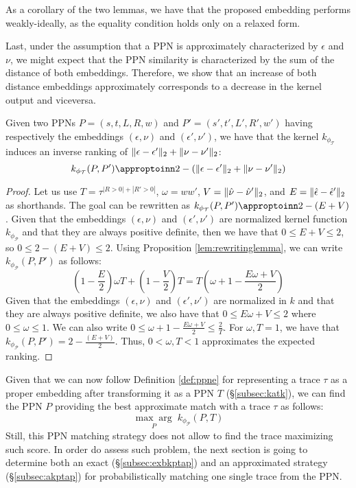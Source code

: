 As a corollary of the two lemmas, we have that the proposed embedding performs weakly-ideally, as the equality condition holds only on a relaxed form.

Last, under the assumption that a PPN is approximately characterized by $\epsilon$ and $\nu$, we might expect that the PPN similarity is characterized by the sum of the distance of both embeddings. Therefore, we show that an increase of both distance embeddings approximately corresponds to a decrease in the kernel output and viceversa.

\begin{lemma}\label{lem:approxRank}
Given two PPNs $P=(s,t,L,R,w)$ and $P'=(s',t',L',R',w')$ having respectively the embeddings $(\epsilon,\nu)$ and $(\epsilon',\nu')$, we have that the kernel $k_{\phi_{\mathcal{T}}}$ induces an inverse ranking of $\|\epsilon-\epsilon'\|_{2}+\|\nu-\nu'\|_{2}$:
$$k_{\phi_{\mathcal{T}}}(P,P')\appropto 2-(\norm{\epsilon-\epsilon'}{2}+\norm{\nu-\nu'}{2})$$
\end{lemma}
\begin{proof}
Let us use $T=\tau^{|R>0|+|R'>0|}$, $\omega=ww'$, $V=\|\hat{\nu}-\hat{\nu}'\|_{2}$, and $E=\|\hat{\epsilon}-\hat{\epsilon}'\|_{2}$ as shorthands. The goal can be rewritten as $k_{\phi_{\mathcal{T}}}(P,P')\appropto 2-(E+V)$. Given that the embeddings $(\epsilon,\nu)$ and $(\epsilon',\nu')$ are normalized kernel function $k_{\phi_{\mathcal{P}}}$ and that they are always positive definite, then we have that $0\leq E +V\leq 2$, so $0\leq 2-(E+V)\leq 2$. Using Proposition \ref{lem:rewritinglemma}, we can write $k_{\phi_{\mathcal{P}}}(P,P')$ as follows:
$$\left(1-\frac{E}{2}\right)\omega T+\left(1-\frac{V}{2}\right)T=T\left(\omega+1-\frac{E\omega+V}{2}\right)$$
Given that the embeddings $(\epsilon,\nu)$ and $(\epsilon',\nu')$ are normalized in $k$ and that they are always positive definite,  we also have that $0\leq E\omega +V\leq 2$ where $0\leq \omega\leq 1$. We can also write  $0\leq \omega+1-\frac{E\omega+V}{2}\leq \frac{2}{T}$. For $\omega,T=1$, we have that $k_{\phi_{\mathcal{P}}}(P,P')=2-\frac{(E+V)}{2}$. Thus, $0<\omega,T<1$ approximates the expected ranking. 
\end{proof}

Given that we can now follow Definition \ref{def:ppne} for representing a trace $\tau$ as a proper embedding after transforming it as a PPN $T$ (\S\ref{subsec:katk}), we can find the PPN $P$ providing the best approximate match with  a trace $\tau$ as follows:
\[\underset{{P}}{\max\arg}\;k_{\phi_{\mathcal{P}}}(P,T)\]
Still, this PPN matching strategy does not allow to find the trace maximizing such score. In order do assess such problem, the next section is going to determine both an exact (\S\ref{subsec:exbkptap}) and an approximated strategy (\S\ref{subsec:akptap}) for probabilistically matching one single trace from the PPN.
